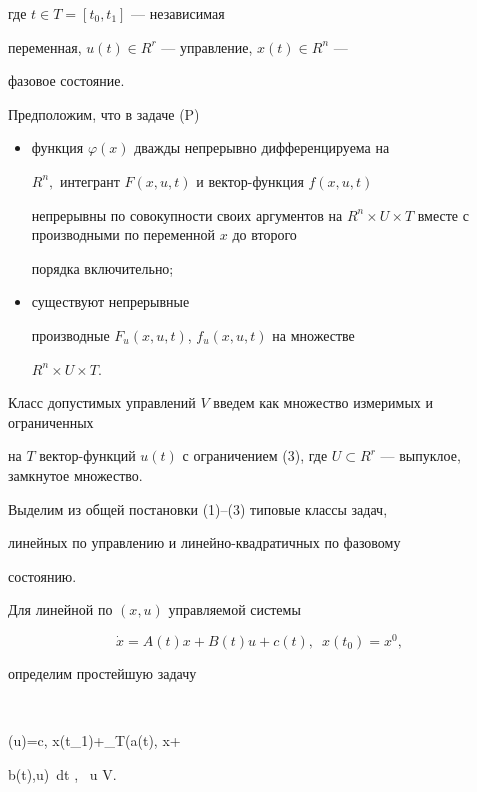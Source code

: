 где $t\in T=[t_{0},t_{1}]$ --- независимая


переменная, $u(t)\in R^{r}$ --- управление, $x(t)\in R^{n}$ ---


фазовое состояние.


Предположим, что в задаче (P)


\begin{itemize}


\item[1)] функция $\varphi(x)$ дважды непрерывно дифференцируема на


$R^{n},$ интегрант $F(x, u, t)$ и вектор-функция $ f(x, u, t)$


непрерывны по совокупности своих аргументов на $ R^{n} \times U


\times T$ вместе с производными по переменной $x $ до второго


порядка включительно;


\item[2)] существуют непрерывные 


производные $F_{u}(x, u, t)$, $f_{u}(x, u, t)$ на множестве 


$ R^{n} \times U \times T$.


\end{itemize}





Класс допустимых управлений $V$ введем как множество измеримых и ограниченных


на $T$ вектор-функций $u(t)$ с ограничением (3), где $U \subset


R^{r}$ --- выпуклое, замкнутое множество.





Выделим из общей постановки (1)--(3) типовые классы задач,


линейных по управлению и линейно-квадратичных по фазовому


состоянию.


Для линейной по $(x, u)$ управляемой системы


$$


\Dot{x}=A(t)x+B(t)u+c(t), \ \; x(t_{0})=x^{0},


$$


определим простейшую задачу


$$


\Phi(u)=\langle c, x(t_{1})\rangle+\int_{T}(\langle a(t), x\rangle+


\langle b(t),u\rangle)~dt \rightarrow \min,\ \; u \in V.


